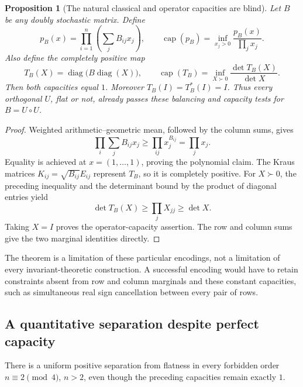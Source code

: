 \documentclass[11pt]{article}
\newtheorem{proposition}[theorem]{Proposition}
\begin{document}
\begin{proposition}[The natural classical and operator capacities are blind]
Let $B$ be any doubly stochastic matrix. Define
\[
 p_B(x)=\prod_{i=1}^n\left(\sum_j B_{ij}x_j\right),\qquad
 \operatorname{cap}(p_B)=\inf_{x_j>0}\frac{p_B(x)}{\prod_jx_j}.
\]
Also define the completely positive map
\[
 T_B(X)=\operatorname{diag}\bigl(B\operatorname{diag}(X)\bigr),
 \qquad
 \operatorname{cap}(T_B)=\inf_{X\succ0}
       \frac{\det T_B(X)}{\det X}.
\]
Then both capacities equal $1$. Moreover
$T_B(I)=T_B^*(I)=I$. Thus every orthogonal $U$, flat or not,
already passes these balancing and capacity tests for $B=U\circ U$.
\end{proposition}
\begin{proof}
Weighted arithmetic--geometric mean, followed by the column sums, gives
\[
 \prod_i\sum_jB_{ij}x_j
 \ge\prod_{ij}x_j^{B_{ij}}=\prod_jx_j.
\]
Equality is achieved at $x=(1,\ldots,1)$, proving the polynomial claim.
The Kraus matrices $K_{ij}=\sqrt{B_{ij}}E_{ij}$ represent $T_B$, so it
is completely positive. For $X\succ0$, the preceding inequality and
the determinant bound by the product of diagonal entries yield
\[
 \det T_B(X)\ge\prod_jX_{jj}\ge\det X.
\]
Taking $X=I$ proves the operator-capacity assertion. The row and column
sums give the two marginal identities directly.
\end{proof}

The theorem is a limitation of these particular encodings, not a
limitation of every invariant-theoretic construction. A successful
encoding would have to retain constraints absent from row and column
marginals and these constant capacities, such as simultaneous real
sign cancellation between every pair of rows.

\subsection{A quantitative separation despite perfect capacity}
There is a uniform positive separation from flatness in every forbidden
order $n\equiv2\pmod4$, $n>2$, even though the preceding capacities
remain exactly $1$.
\end{document}
